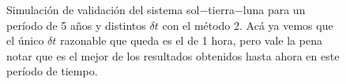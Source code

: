 \begin{figure}
{	\label{fig:ej1_m2_1825_12}
	}
	\caption{
		Simulación de validación del sistema sol$-$tierra$-$luna para un período de 5 años y distintos $\delta t$
		con el método 2.
		Acá ya vemos que el único $\delta t$ razonable que queda es el de 1 hora,
		pero vale la pena notar que es el mejor de los resultados obtenidos hasta ahora en este período de tiempo.
	}
	\label{ fig:res_ej1_m2_1825 }
\end{figure}
